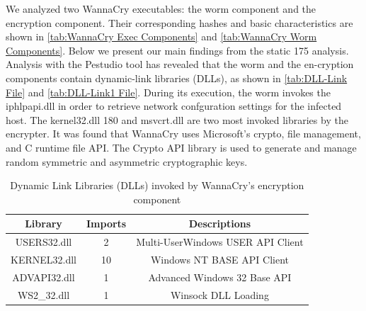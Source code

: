 \documentclass[12pt,letterpaper]{article}
\begin{document}
        We analyzed two WannaCry executables: the worm component and the
        encryption component. Their corresponding hashes and basic characteristics are shown in \autoref{tab:WannaCry Exec Components} and \autoref{tab:WannaCry Worm Components}. Below we present our main findings from the static 175 analysis.
        Analysis with the Pestudio tool has revealed that the worm and the en-cryption components contain dynamic-link libraries (DLLs), as shown in \autoref{tab:DLL-Link File} and \autoref{tab:DLL-Link1 File}. During its execution, the worm invokes the iphlpapi.dll in order to retrieve network confguration settings for the infected host. The kernel32.dll 180 and msvcrt.dll are two most invoked libraries by the encrypter. It was found that WannaCry uses Microsoft's crypto, file management, and C runtime file \ac{API}. The Crypto API library is used to generate and manage random symmetric and asymmetric cryptographic keys.


        \begin{table}[h]
            \centering
            \caption{Dynamic Link Libraries (DLLs) invoked by WannaCry's encryption component}
            \label{tab:DLL-Link File}
            \begin{tabular}{ccc}
                \toprule
                \textbf{Library} & \textbf{Imports} & \textbf{Descriptions} \\
                \midrule
                USERS32.dll & 2& Multi-UserWindows USER API Client\\
                KERNEL32.dll & 10& Windows NT BASE API Client\\
                ADVAPI32.dll & 1& Advanced Windows 32 Base API\\
                WS2\_32.dll & 1& Winsock DLL Loading\\
                \bottomrule
            \end{tabular}
        \end{table}
\end{document}
